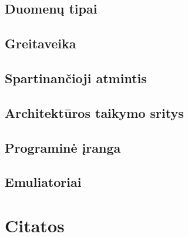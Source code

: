 \documentclass{article}
\begin{document}
\subsection{Duomenų tipai}
\subsection{Greitaveika}
\subsection{Spartinančioji atmintis}
\subsection{Architektūros taikymo sritys}
\subsection{Programinė įranga}
\subsection{Emuliatoriai}
\section{Citatos}
\end{document}
